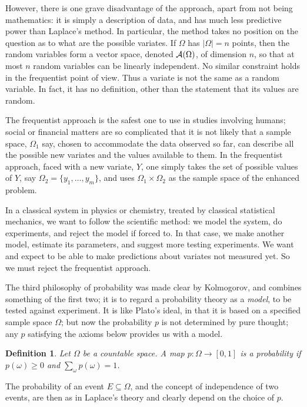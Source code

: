 \documentclass[12pt]{article}
\newtheorem{definition}[theorem]{Definition}
\begin{document}
However, there is one
grave disadvantage of the approach, apart from not being mathematics: it
is simply a description of data, and has much less predictive power than
Laplace's method. In particular, the method takes no position on the
question as to what are the possible variates. If
$\Omega$ has $|\Omega|=n$ points, then the random variables form a vector
space, denoted ${\cal A}(\Omega)$, of dimension $n$, so that at most $n$
random variables can
be linearly independent. No similar constraint holds in the frequentist
point of view. Thus a variate is not the same as a random variable.
In fact, it has no definition, other than the statement that its values are
random.

The frequentist approach is the safest one to use in studies
involving humans; social or financial matters are so complicated that
it is not likely that a sample space, $\Omega_1$ say, chosen to accommodate
the data observed so far, can describe all the possible new variates and the
values available to them. In the frequentist approach, faced with a new
variate, $Y$, one simply
takes the set of possible values of $Y$, say $\Omega_2=\{y_1,\ldots,y_m\}$,
and uses $\Omega_1\times\Omega_2$
as the sample space of the enhanced problem.

In a classical system in physics or chemistry, treated by classical
statistical mechanics, we want to follow the
scientific method: we model the system, do experiments, and
reject the model if forced to. In that case, we make another model,
estimate its parameters, and suggest more testing experiments.
We want and expect to be able to make predictions about variates not
measured yet. So we must reject the frequentist approach.

The third philosophy of probability \cite{Kolmogorov} was made clear by Kolmogorov, and
combines something of the first two;
it is to regard a probability theory as a {\em model}, to be tested
against experiment. It is like Plato's ideal, in that it
is based on a specified sample space $\Omega$;
but now the probability $p$ is not determined by
pure thought; any $p$ satisfying the axioms below provides us with a model.
\begin{definition}
Let $\Omega$ be a countable space.
A map $p:\Omega\rightarrow[0,1]$ is a {\em probability} if
$p(\omega)\geq0$ and $\sum_\omega p(\omega)=1$.
\label{probability}
\end{definition}
The probability of an event $E\subseteq\Omega$, and the concept of
independence of two events, are then as in Laplace's theory and clearly
depend on the choice of $p$.
\end{document}
